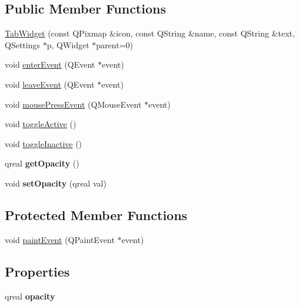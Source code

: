 \subsection*{Public Member Functions}
\begin{DoxyCompactItemize}
\item 
\hyperlink{class_tab_widget_a4d9761222b2af9b1f010fa9a1c06950d}{Tab\+Widget} (const Q\+Pixmap \&icon, const Q\+String \&name, const Q\+String \&text, Q\+Settings $\ast$p, Q\+Widget $\ast$parent=0)
\item 
void \hyperlink{class_tab_widget_a22dd3a7f2e5bb36816502a7e8bfec9c8}{enter\+Event} (Q\+Event $\ast$event)
\item 
void \hyperlink{class_tab_widget_a1b0a65047f8fb9bf5c67b95c32ae4c0a}{leave\+Event} (Q\+Event $\ast$event)
\item 
void \hyperlink{class_tab_widget_a32f538fd47196a94d2ceff7c8040420b}{mouse\+Press\+Event} (Q\+Mouse\+Event $\ast$event)
\item 
void \hyperlink{class_tab_widget_ac5ebab9aab84a8521cf8169b3f4599eb}{toggle\+Active} ()
\item 
void \hyperlink{class_tab_widget_a15f634c55c675b48c16b997eb7eb4b0f}{toggle\+Inactive} ()
\item 
\hypertarget{class_tab_widget_abbf3563cce7077e4d5b21396736f1278}{}qreal {\bfseries get\+Opacity} ()\label{class_tab_widget_abbf3563cce7077e4d5b21396736f1278}

\item 
\hypertarget{class_tab_widget_a47a7f14a6c8f8d1f27016e0d46683885}{}void {\bfseries set\+Opacity} (qreal val)\label{class_tab_widget_a47a7f14a6c8f8d1f27016e0d46683885}

\end{DoxyCompactItemize}
\subsection*{Protected Member Functions}
\begin{DoxyCompactItemize}
\item 
void \hyperlink{class_tab_widget_a6aa2811f73f9786fa8cf51e493a3f54a}{paint\+Event} (Q\+Paint\+Event $\ast$event)
\end{DoxyCompactItemize}
\subsection*{Properties}
\begin{DoxyCompactItemize}
\item 
\hypertarget{class_tab_widget_a21a9715954d5da6dcfa503a298586588}{}qreal {\bfseries opacity}\label{class_tab_widget_a21a9715954d5da6dcfa503a298586588}

\end{DoxyCompactItemize}


